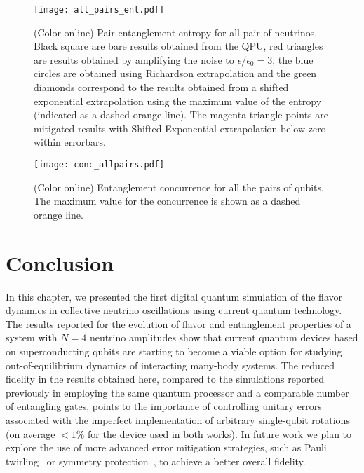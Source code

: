 \documentclass[10pt]{article}
\begin{document}
\begin{figure}[H]
 \centering
 \texttt{[image: all\_pairs\_ent.pdf]}
 \caption{(Color online) Pair entanglement entropy for all pair of neutrinos. Black square are bare results obtained from the QPU, red triangles are results obtained by amplifying the noise to $\epsilon/\epsilon_0=3$, the blue circles are obtained using Richardson extrapolation and the green diamonds correspond to the results obtained from a shifted exponential extrapolation using the maximum value of the entropy (indicated as a dashed orange line). The magenta triangle points are mitigated results with Shifted Exponential extrapolation below zero within errorbars.}
\label{fig:pair_ent_all}
\end{figure}

\begin{figure}[H]
 \centering
 \texttt{[image: conc\_allpairs.pdf]}
 \caption{(Color online) Entanglement concurrence for all the pairs of qubits. The maximum value for the concurrence is shown as a dashed orange line.}
\label{fig:conc_pair_1}
\end{figure}

\section{Conclusion}
\label{sec:conclusion}

In this chapter, we presented the first digital quantum simulation of the flavor dynamics in collective neutrino oscillations using current quantum technology. The results reported for the evolution of flavor and entanglement properties of a system with $N=4$ neutrino amplitudes show that current quantum devices based on superconducting qubits are starting to become a viable option for studying out-of-equilibrium dynamics of interacting many-body systems. The reduced fidelity in the results obtained here, compared to the simulations reported previously in \cite{Roggero_nptodg} employing the same quantum processor and a comparable number of entangling gates, points to the importance of controlling unitary errors associated with the imperfect implementation of arbitrary single-qubit rotations (on average $<1\%$ for the device used in both works). In future work we plan to explore the use of more advanced error mitigation strategies, such as Pauli twirling~\cite{Wallman2016} or symmetry protection~\cite{Tran2021}, to achieve a better overall fidelity.
\end{document}
